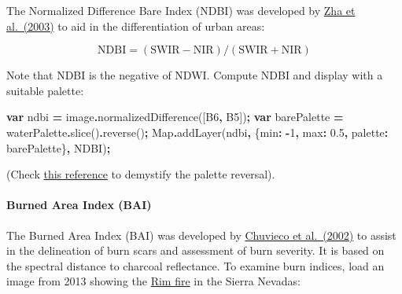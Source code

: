 \documentclass[
]{article}
\newenvironment{Shaded}{\begin{snugshade}}{\end{snugshade}}
\newcommand{\BuiltInTok}[1]{#1}
\newcommand{\DataTypeTok}[1]{\textcolor[rgb]{0.13,0.29,0.53}{#1}}
\newcommand{\DecValTok}[1]{\textcolor[rgb]{0.00,0.00,0.81}{#1}}
\newcommand{\FloatTok}[1]{\textcolor[rgb]{0.00,0.00,0.81}{#1}}
\newcommand{\FunctionTok}[1]{\textcolor[rgb]{0.00,0.00,0.00}{#1}}
\newcommand{\KeywordTok}[1]{\textcolor[rgb]{0.13,0.29,0.53}{\textbf{#1}}}
\newcommand{\NormalTok}[1]{#1}
\newcommand{\OperatorTok}[1]{\textcolor[rgb]{0.81,0.36,0.00}{\textbf{#1}}}
\newcommand{\StringTok}[1]{\textcolor[rgb]{0.31,0.60,0.02}{#1}}
\begin{document}
The Normalized Difference Bare Index (NDBI) was developed by \href{http://www.tandfonline.com/doi/abs/10.1080/01431160304987}{Zha et al.~(2003)} to aid in the differentiation of urban areas:

\[ \text{NDBI} = (\text{SWIR} - \text{NIR}) / (\text{SWIR} + \text{NIR}) \]

Note that NDBI is the negative of NDWI. Compute NDBI and display with a suitable palette:

\begin{Shaded}
\begin{Highlighting}[]
\KeywordTok{var}\NormalTok{ ndbi }\OperatorTok{=}\NormalTok{ image}\OperatorTok{.}\FunctionTok{normalizedDifference}\NormalTok{([}\StringTok{\textquotesingle{}B6\textquotesingle{}}\OperatorTok{,} \StringTok{\textquotesingle{}B5\textquotesingle{}}\NormalTok{])}\OperatorTok{;}   
\KeywordTok{var}\NormalTok{ barePalette }\OperatorTok{=}\NormalTok{  waterPalette}\OperatorTok{.}\FunctionTok{slice}\NormalTok{()}\OperatorTok{.}\FunctionTok{reverse}\NormalTok{()}\OperatorTok{;}   
\BuiltInTok{Map}\OperatorTok{.}\FunctionTok{addLayer}\NormalTok{(ndbi}\OperatorTok{,}\NormalTok{ \{}\DataTypeTok{min}\OperatorTok{:} \OperatorTok{{-}}\DecValTok{1}\OperatorTok{,} \DataTypeTok{max}\OperatorTok{:} \FloatTok{0.5}\OperatorTok{,}  \DataTypeTok{palette}\OperatorTok{:}\NormalTok{ barePalette\}}\OperatorTok{,} \StringTok{\textquotesingle{}NDBI\textquotesingle{}}\NormalTok{)}\OperatorTok{;}  
\end{Highlighting}
\end{Shaded}

(Check \href{https://developer.mozilla.org/en-US/docs/Web/JavaScript/Reference/Global_Objects/Array}{this reference} to demystify the palette reversal).

\hypertarget{burned-area-index-bai}{%
\paragraph{Burned Area Index (BAI)}\label{burned-area-index-bai}}

The Burned Area Index (BAI) was developed by \href{http://www.tandfonline.com/doi/abs/10.1080/01431160210153129}{Chuvieco et al.~(2002)} to assist in the delineation of burn scars and assessment of burn severity. It is based on the spectral distance to charcoal reflectance. To examine burn indices, load an image from 2013 showing the \href{https://en.wikipedia.org/wiki/Rim_Fire}{Rim fire} in the Sierra Nevadas:
\end{document}
